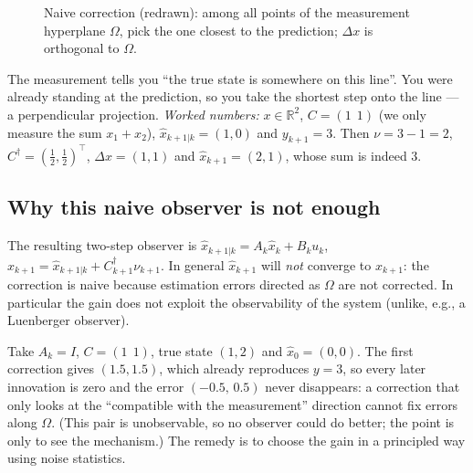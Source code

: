 \documentclass[11pt,a4paper]{article}
\def\boldsymbol#1{#1}%
\def\mathbf#1{#1}%
\newcommand{\Rn}{\mathbb{R}}
\newcommand{\tp}{^{\top}}
\newcommand{\pinv}{^{\dagger}}
\newcommand{\hx}{\hat{\boldsymbol{x}}}
\newcommand{\bx}{\boldsymbol{x}}
\newcommand{\bu}{\boldsymbol{u}}
\newcommand{\bnu}{\boldsymbol{\nu}}
\newcommand{\mA}{\mathbf{A}}
\newcommand{\mB}{\mathbf{B}}
\newcommand{\mC}{\mathbf{C}}
\newcommand{\mI}{\mathbf{I}}
\theoremstyle{definition}
\theoremstyle{plain}
\theoremstyle{remark}
\begin{document}
\begin{figure}[H]
\centering
{}
\caption{Naive correction (redrawn): among all points of the measurement hyperplane $\Omega$, pick the one closest to the
prediction; $\Delta\bx$ is orthogonal to $\Omega$.}\label{fig:naive}
\end{figure}

\begin{intuition}
The measurement tells you ``the true state is somewhere on this line''. You were already standing at the prediction, so
you take the shortest step onto the line --- a perpendicular projection. \emph{Worked numbers:} $\bx\in\Rn^2$,
$\mC=(1\ \ 1)$ (we only measure the sum $x_1+x_2$), $\hx_{k+1|k}=(1,0)$ and $y_{k+1}=3$. Then $\nu=3-1=2$,
$\mC\pinv=(\tfrac12,\tfrac12)\tp$, $\Delta\bx=(1,1)$ and $\hx_{k+1}=(2,1)$, whose sum is indeed $3$.
\end{intuition}

\subsection{Why this naive observer is not enough}

The resulting two-step observer is $\hx_{k+1|k}=\mA_k\hx_k+\mB_k\bu_k$, $\hx_{k+1}=\hx_{k+1|k}+\mC_{k+1}\pinv\bnu_{k+1}$.
In general $\hx_{k+1}$ will \emph{not} converge to $\bx_{k+1}$: the correction is naive because estimation errors
directed as $\Omega$ are not corrected. In particular the gain does not exploit the observability of the system
(unlike, e.g., a Luenberger observer).

\begin{intuition}
Take $\mA_k=\mI$, $\mC=(1\ \ 1)$, true state $(1,2)$ and $\hx_0=(0,0)$. The first correction gives
$(1.5,1.5)$, which already reproduces $y=3$, so every later innovation is zero and the error $(-0.5,\,0.5)$ never
disappears: a correction that only looks at the ``compatible with the measurement'' direction cannot fix errors along
$\Omega$. (This pair is unobservable, so no observer could do better; the point is only to see the mechanism.)
The remedy is to choose the gain in a principled way using noise statistics.
\end{intuition}
\end{document}
